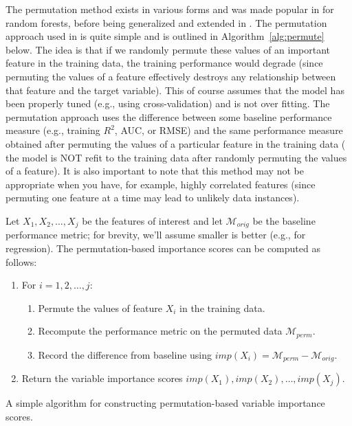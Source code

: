 The permutation method exists in various forms and was made popular in \citet{random-breiman-2001} for random forests, before being generalized and extended in \citet{fisher-model-2018}. The permutation approach used in  is quite simple and is outlined in Algorithm~\ref{alg:permute} below. The idea is that if we randomly permute these values of an important feature in the training data, the training performance would degrade (since permuting the values of a feature effectively destroys any relationship between that feature and the target variable). This of course assumes that the model has been properly tuned (e.g., using cross-validation) and is not over fitting. The permutation approach uses the difference between some baseline performance measure (e.g., training $R^2$, AUC, or RMSE) and the same performance measure obtained after permuting the values of a particular feature in the training data ( the model is NOT refit to the training data after randomly permuting the values of a feature). It is also important to note that this method may not be appropriate when you have, for example, highly correlated features (since permuting one feature at a time may lead to unlikely data instances). 

Let $X_1, X_2, \dots, X_j$ be the features of interest and let $\mathcal{M}_{orig}$ be the baseline performance metric; for brevity, we'll assume smaller is better (e.g.,  for regression). The permutation-based importance scores can be computed as follows:

\begin{algorithm}
\begin{enumerate}
  \item For $i = 1, 2, \dots, j$:
  \begin{enumerate}
    \item Permute the values of feature $X_i$ in the training data.
    \item Recompute the performance metric on the permuted data $\mathcal{M}_{perm}$.
    \item Record the difference from baseline using $imp\left(X_i\right) = \mathcal{M}_{perm} - \mathcal{M}_{orig}$.
  \end{enumerate}
  \item Return the variable importance scores $imp\left(X_1\right), imp\left(X_2\right), \dots, imp\left(X_j\right)$.
\end{enumerate}
\caption{A simple algorithm for constructing permutation-based variable importance scores. \label{alg:permute}}
\end{algorithm}

